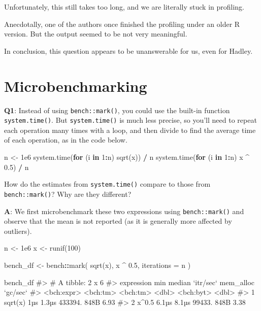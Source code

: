 \documentclass[
]{krantz}
\makeatletter
\newenvironment{Shaded}{\begin{snugshade}}{\end{snugshade}}
\newcommand{\CommentTok}[1]{\textcolor[rgb]{0.56,0.35,0.01}{\textit{#1}}}
\newcommand{\ControlFlowTok}[1]{\textcolor[rgb]{0.13,0.29,0.53}{\textbf{#1}}}
\newcommand{\DataTypeTok}[1]{\textcolor[rgb]{0.13,0.29,0.53}{#1}}
\newcommand{\DecValTok}[1]{\textcolor[rgb]{0.00,0.00,0.81}{#1}}
\newcommand{\FloatTok}[1]{\textcolor[rgb]{0.00,0.00,0.81}{#1}}
\newcommand{\KeywordTok}[1]{\textcolor[rgb]{0.13,0.29,0.53}{\textbf{#1}}}
\newcommand{\NormalTok}[1]{#1}
\newcommand{\OperatorTok}[1]{\textcolor[rgb]{0.81,0.36,0.00}{\textbf{#1}}}
\newcommand{\StringTok}[1]{\textcolor[rgb]{0.31,0.60,0.02}{#1}}
\newenvironment{kframe}{%
\medskip{}
\setlength{\fboxsep}{.8em}
 \def\at@end@of@kframe{}%
 \ifinner\ifhmode%
  \def\at@end@of@kframe{\end{minipage}}%
  \begin{minipage}{\columnwidth}%
 \fi\fi%
 \def\FrameCommand##1{\hskip\@totalleftmargin \hskip-\fboxsep
 \colorbox{shadecolor}{##1}\hskip-\fboxsep
     \hskip-\linewidth \hskip-\@totalleftmargin \hskip\columnwidth}%
 \MakeFramed {\advance\hsize-\width
   \@totalleftmargin\z@ \linewidth\hsize
   \@setminipage}}%
 {\par\unskip\endMakeFramed%
 \at@end@of@kframe}
\renewenvironment{Shaded}{\begin{kframe}}{\end{kframe}}
\renewcommand{\KeywordTok} [1]{\textcolor[rgb]{0.00,0.44,0.13}{{#1}}}
\renewcommand{\DataTypeTok}[1]{\textcolor[rgb]{0.56,0.13,0.00}{{#1}}}
\renewcommand{\DecValTok}  [1]{\textcolor[rgb]{0.25,0.63,0.44}{{#1}}}
\renewcommand{\FloatTok}   [1]{\textcolor[rgb]{0.25,0.63,0.44}{{#1}}}
\renewcommand{\StringTok}  [1]{\textcolor[rgb]{0.25,0.44,0.63}{{#1}}}
\renewcommand{\CommentTok} [1]{\textcolor[rgb]{0.38,0.63,0.69}{{#1}}}
\renewcommand{\NormalTok}  [1]{{#1}}
\makeatother
\begin{document}
Unfortunately, this still takes too long, and we are literally stuck in profiling.

Anecdotally, one of the authors once finished the profiling under an older R version. But the output seemed to be not very meaningful.

In conclusion, this question appears to be unanswerable for us, even for Hadley.

\hypertarget{microbenchmarking}{%
\section{Microbenchmarking}\label{microbenchmarking}}

\textbf{{Q1}}: Instead of using \texttt{bench::mark()}, you could use the built-in function \texttt{system.time()}. But \texttt{system.time()} is much less precise, so you'll need to repeat each operation many times with a loop, and then divide to find the average time of each operation, as in the code below.

\begin{Shaded}
\begin{Highlighting}[]
\NormalTok{n <-}\StringTok{ }\FloatTok{1e6}
\KeywordTok{system.time}\NormalTok{(}\ControlFlowTok{for}\NormalTok{ (i }\ControlFlowTok{in} \DecValTok{1}\OperatorTok{:}\NormalTok{n) }\KeywordTok{sqrt}\NormalTok{(x)) }\OperatorTok{/}\StringTok{ }\NormalTok{n}
\KeywordTok{system.time}\NormalTok{(}\ControlFlowTok{for}\NormalTok{ (i }\ControlFlowTok{in} \DecValTok{1}\OperatorTok{:}\NormalTok{n) x }\OperatorTok{^}\StringTok{ }\FloatTok{0.5}\NormalTok{) }\OperatorTok{/}\StringTok{ }\NormalTok{n}
\end{Highlighting}
\end{Shaded}

How do the estimates from \texttt{system.time()} compare to those from \texttt{bench::mark()}? Why are they different?

\textbf{{A}}: We first microbenchmark these two expressions using \texttt{bench::mark()} and observe that the mean is not reported (as it is generally more affected by outliers).

\begin{Shaded}
\begin{Highlighting}[]
\NormalTok{n <-}\StringTok{ }\FloatTok{1e6}
\NormalTok{x <-}\StringTok{ }\KeywordTok{runif}\NormalTok{(}\DecValTok{100}\NormalTok{)}

\NormalTok{bench_df <-}\StringTok{ }\NormalTok{bench}\OperatorTok{::}\KeywordTok{mark}\NormalTok{(}
  \KeywordTok{sqrt}\NormalTok{(x), }
\NormalTok{  x }\OperatorTok{^}\StringTok{ }\FloatTok{0.5}\NormalTok{,}
  \DataTypeTok{iterations =}\NormalTok{ n}
\NormalTok{)}

\NormalTok{bench_df}
\CommentTok{#> # A tibble: 2 x 6}
\CommentTok{#>   expression      min   median `itr/sec` mem_alloc `gc/sec`}
\CommentTok{#>   <bch:expr> <bch:tm> <bch:tm>     <dbl> <bch:byt>    <dbl>}
\CommentTok{#> 1 sqrt(x)         1µs    1.3µs   433394.      848B     6.93}
\CommentTok{#> 2 x^0.5         6.1µs    8.1µs    99433.      848B     3.38}
\end{Highlighting}
\end{Shaded}
\end{document}
